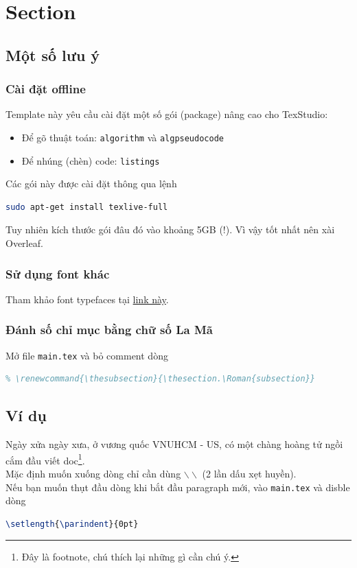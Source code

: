 % 











\section{Section}

\subsection{Một số lưu ý}

\subsubsection{Cài đặt offline}
Template này yêu cầu cài đặt một số gói (package) nâng cao cho TexStudio:
\begin{itemize}
\item Để gõ thuật toán: \texttt{algorithm} và \texttt{algpseudocode}
\item Để nhúng (chèn) code: \texttt{listings}
\end{itemize}
Các gói này được cài đặt thông qua lệnh
\begin{lstlisting}[language=sh]
sudo apt-get install texlive-full
\end{lstlisting}
Tuy nhiên kích thước gói đâu đó vào khoảng 5GB (!). Vì vậy tốt nhất nên xài Overleaf.

\subsubsection{Sử dụng font khác}
Tham khảo font typefaces tại \href{https://www.overleaf.com/learn/latex/Font_typefaces}{link này}.

\subsubsection{Đánh số chỉ mục bằng chữ số La Mã}
Mở file \texttt{main.tex} và bỏ comment dòng 
\begin{lstlisting}[language=tex]
% \renewcommand{\thesection}{\Roman{section}}
% \renewcommand{\thesubsection}{\thesection.\Roman{subsection}}  
\end{lstlisting}

\subsection{Ví dụ}
Ngày xửa ngày xưa, ở vương quốc VNUHCM - US, có một chàng hoàng tử ngồi cắm đầu viết doc\footnote{Đây là footnote, chú thích lại những gì cần chú ý.}.\\
Mặc định muốn xuống dòng chỉ cần dùng $\backslash\backslash$  (2 lần dấu xẹt huyền).\\
Nếu bạn muốn thụt đầu dòng khi bắt đầu paragraph mới, vào \texttt{main.tex} và disble dòng
\begin{lstlisting}[language=tex]
\setlength{\parindent}{0pt}
\end{lstlisting}

